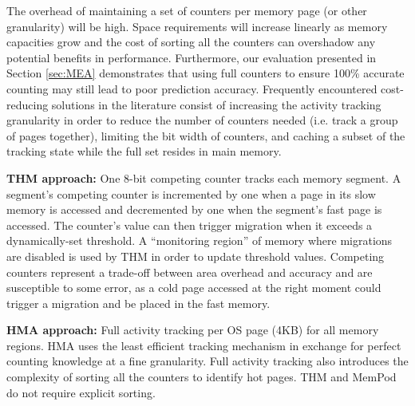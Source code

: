 The overhead of maintaining a set of counters per memory page (or other granularity) will be high. Space requirements will increase linearly as memory capacities grow and the cost of sorting all the counters can overshadow any potential benefits in performance. Furthermore, our evaluation presented in Section \ref{sec:MEA} demonstrates that using full counters to ensure 100\% accurate counting may still lead to poor prediction accuracy. Frequently encountered cost-reducing solutions in the literature consist of increasing the activity tracking granularity in order to reduce the number of counters needed (i.e. track a group of pages together), limiting the bit width of counters, and caching a subset of the tracking state while the full set resides in main memory. 




	\textbf{THM approach:} One 8-bit competing counter tracks each memory segment. A segment's competing counter is incremented by one when a page in its slow memory is accessed and decremented by one when the segment's fast page is accessed. The counter's value can then trigger migration when it exceeds a dynamically-set threshold. A ``monitoring region'' of memory where migrations are disabled is used by THM in order to update threshold values. Competing counters represent a trade-off between area overhead and accuracy and are susceptible to some error, as a cold page accessed at the right moment could trigger a migration and be placed in the fast memory.

	\textbf{HMA approach:} Full activity tracking per OS page (4KB) for all memory regions. HMA uses the least efficient tracking mechanism in exchange for perfect counting knowledge at a fine granularity. Full activity tracking also introduces the complexity of sorting all the counters to identify hot pages. THM and MemPod do not require explicit sorting.
	
